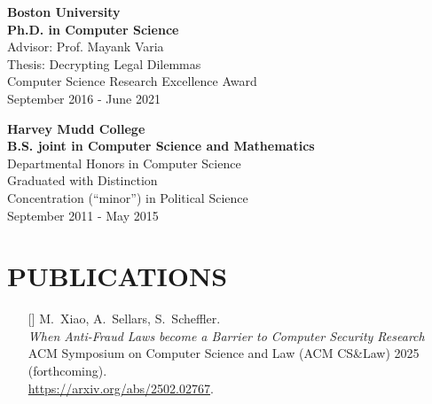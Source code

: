 \documentclass{res}
\begin{document}
\begin{resume}
    \textbf{Boston University} \\
    \textbf{Ph.D. in Computer Science} \\
    Advisor: Prof. Mayank Varia \\
    Thesis: Decrypting Legal Dilemmas \\
    Computer Science Research Excellence Award \\
    September 2016 - June 2021

    \textbf{Harvey Mudd College} \\
    \textbf{B.S. joint in Computer Science and Mathematics}  \\
    Departmental Honors in Computer Science \\
    Graduated with Distinction \\
    Concentration (``minor'') in Political Science \\
    September 2011 - May 2015

\section{PUBLICATIONS}
\vspace{0.25in}

\setcounter{citctr}{1}
\edef\fraudethics{[\arabic{citctr}]}
\edef\eeegroup{[\arabic{citctr}]}
\edef\csamimprovements{[\arabic{citctr}]}
\edef\eeesok{[\arabic{citctr}]}
\edef\foregoneVerif{[\arabic{citctr}]}
\edef\copyrightMDL{[\arabic{citctr}]}
\edef\turboikos{[\arabic{citctr}]}
\edef\booligero{[\arabic{citctr}]}
\edef\foregoneconclusion{[\arabic{citctr}]}
\edef\privateTranslation{[\arabic{citctr}]}
\edef\AEC{[\arabic{citctr}]}
\edef\pullingblocksJIP{[\arabic{citctr}]}
\edef\devicefingerprinting{[\arabic{citctr}]}
\edef\pullingblocks{[\arabic{citctr}]}
\edef\fairsibility{[\arabic{citctr}]}
\edef\emailspam{[\arabic{citctr}]}


\begin{itemize}
\item[\fraudethics] M.~Xiao, A.~Sellars, S.~Scheffler. \\
\emph{When Anti-Fraud Laws become a Barrier to Computer Security Research} \\
ACM Symposium on Computer Science and Law (ACM CS\&Law) 2025 (forthcoming). \\
\url{https://arxiv.org/abs/2502.02767}.


\end{itemize}
\end{resume}
\end{document}
